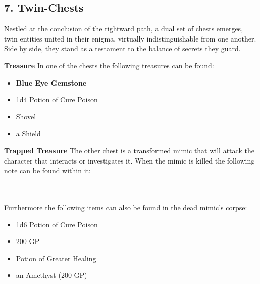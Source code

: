 \subsection*{7. Twin-Chests}
{\entryfont
	Nestled at the conclusion of the rightward path, a dual set of chests emerges, twin entities united in their enigma, virtually indistinguishable from one another. Side by side, they stand as a testament to the balance of secrets they guard.
	
	\vfill\eject
	
	\textbf{Treasure}
	In one of the chests the following treasures can be found:
	\begin{itemize}
		\item \textbf{Blue Eye Gemstone}
		\item 1d4 Potion of Cure Poison
		\item Shovel
		\item a Shield
	\end{itemize}
	
	\textbf{Trapped Treasure}
	The other chest is a transformed mimic that will attack the character that interacts or investigates it. When the mimic is killed the following note can be found within it:\\\\
	\hfill\\
	Furthermore the following items can also be found in the dead mimic's corpse:
	\begin{itemize}
		\item 1d6 Potion of Cure Poison
		\item 200 GP
		\item Potion of Greater Healing
		\item an Amethyst (200 GP)
	\end{itemize}
}

